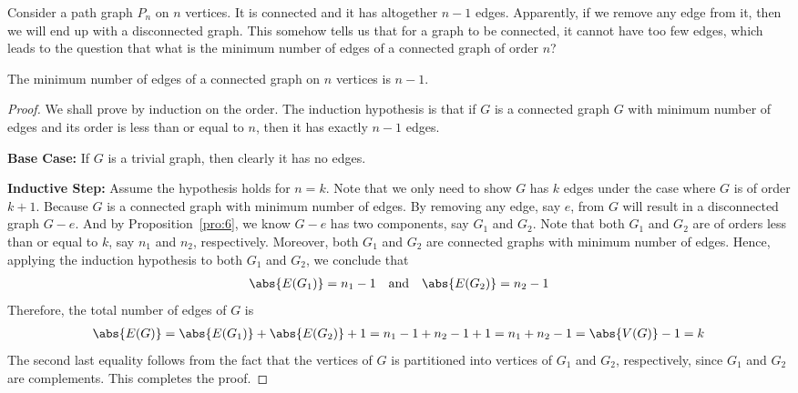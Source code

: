 \documentclass[thmcnt=section, 12pt, color=cyan]{my-elegantbook}
\begin{document}

Consider a path graph $P_n$ on $n$ vertices.
It is connected and it has altogether $n-1$ edges. 
Apparently, if we remove any edge from it, 
then we will end up with a disconnected graph.
This somehow tells us that 
for a graph to be connected,
it cannot have too few edges, 
which leads to the question that 
what is the minimum number of edges 
of a connected graph of order $n$?

\begin{proposition} \label{pro:8}
	The minimum number of edges of 
	a connected graph on $n$ vertices
	is $n-1$.
\end{proposition}

\begin{proof}
	We shall prove by induction on the order.
	The induction hypothesis is that
	if $G$ is a connected graph $G$ with minimum number of edges
	and its order is less than or equal to $n$,
	then it has exactly $n-1$ edges.

	\noindent\textbf{Base Case:} 
	If $G$ is a trivial graph, 
	then clearly it has no edges.

	\noindent\textbf{Inductive Step:}
	Assume the hypothesis holds for $n = k$.
	Note that we only need to show 
	$G$ has $k$ edges under the case where 
	$G$ is of order $k+1$.
	Because $G$ is a connected graph with minimum number
	of edges.
	By removing any edge, say $e$, from $G$ 
	will result in a disconnected graph $G-e$.
	And by Proposition~\ref{pro:6}, 
	we know $G-e$ has two components, say $G_1$ and $G_2$.
	Note that both $G_1$ and $G_2$ are of 
	orders less than or equal to $k$, 
	say $n_1$ and $n_2$, respectively.
	Moreover, both $G_1$ and $G_2$ are connected graphs
	with minimum number of edges.
	Hence, applying the induction hypothesis 
	to both $G_1$ and $G_2$,
	we conclude that 
	\begin{align*}
		\abs{E(G_1)} = n_1 - 1 
		\quad \text{and} \quad 
		\abs{E(G_2)} = n_2 - 1
	\end{align*}
	Therefore, the total number of edges of $G$ is 
	\begin{align*}
		\abs{E(G)} = \abs{E(G_1)} + \abs{E(G_2)} + 1 
		= n_1 - 1 + n_2 - 1 + 1 
		= n_1 + n_2 - 1
		= \abs{V(G)} - 1
		= k
	\end{align*}
	The second last equality follows from the fact that 
	the vertices of $G$ is partitioned into 
	vertices of $G_1$ and $G_2$, respectively,
	since $G_1$ and $G_2$ are complements.
	This completes the proof.
\end{proof}
\end{document}

